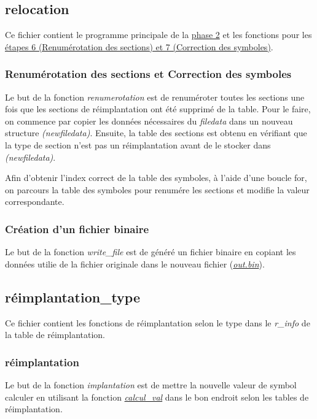 \documentclass[a4paper]{article} %
\begin{document}

\subsection{relocation}
\noindent Ce fichier contient le programme principale de la \hyperref[sec:phase2]{phase 2} et 
les fonctions pour les \hyperref[sec:67]{étapes 6 (Renumérotation des sections) et 7 (Correction des 
symboles)}.  


\subsubsection*{Renumérotation des sections et Correction des symboles}
\label{sec:67}
Le but de la fonction \textit{renumerotation} est de renuméroter toutes les sections 
une fois que les sections de réimplantation ont été supprimé de la table. 
Pour le faire, on commence par copier les données nécessaires du \textit{filedata} 
dans un nouveau structure \textit{(newfiledata)}. Ensuite, la table des sections 
est obtenu en vérifiant que la type de section n'est pas un réimplantation avant de 
le stocker dans \textit{(newfiledata)}.

Afin d'obtenir l'index correct de la table des symboles, à l'aide d'une boucle for,
on parcours la table des symboles pour renumére les sections et modifie la valeur 
correspondante. 


\subsubsection*{Création d'un fichier binaire}
Le but de la fonction \textit{write\_file} est de généré un fichier binaire en 
copiant les données utilie de la fichier originale dans le nouveau fichier 
(\hyperref[sec:bin]{\textit{out.bin}}).

\subsection{réimplantation\_type}
Ce fichier contient les fonctions de réimplantation selon le type dans le \textit{r\_info}
de la table de réimplantation. 

\subsubsection*{réimplantation}
Le but de la fonction \textit{implantation} est de mettre la nouvelle valeur de symbol 
calculer en utilisant la fonction \hyperref[sec:calc]{\textit{calcul\_val}} dans le 
bon endroit selon les tables de réimplantation. 
\end{document}
